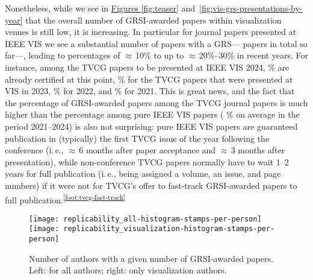 \documentclass[conference,svgnames]{vgtc}                     %
\newcommand*{\percentageRounded}[2]{%
	\pgfmathparse{#1*100/#2}%
	\pgfmathprintnumber[fixed, precision=1]{\pgfmathresult}%
}
\newcommand{\ie}{i.\,e.}
\begin{document}
Nonetheless, while we see in \hyperref[fig:teaser]{Figures \ref{fig:teaser}} and~\ref{fig:vis-grs-presentations-by-year} that the overall number of GRSI-awarded papers within visualization venues is still low, it is increasing. In particular for journal papers presented at IEEE VIS we see a substantial number of papers with a GRS---\GrsiIeeeVisJournalPresentationsCount{} papers in total so far---, leading to percentages of $\approx$\,10\% to up to $\approx$\,20\%--30\% in recent years.
For instance, among the TVCG papers to be presented at IEEE VIS 2024, \percentageRounded{\GrsiIeeeVisTVCGJournalPapersInMMXXIV}{\TotalIeeeVisTVCGJournalPapersInMMXXIV}\% are already certified at this point, \percentageRounded{\GrsiIeeeVisTVCGJournalPapersInMMXXIII}{\TotalIeeeVisTVCGJournalPapersInMMXXIII}\% for the TVCG papers that were presented at VIS in 2023, \percentageRounded{\GrsiIeeeVisTVCGJournalPapersInMMXXII}{\TotalIeeeVisTVCGJournalPapersInMMXXII}\% for 2022, and \percentageRounded{\GrsiIeeeVisTVCGJournalPapersInMMXXI}{\TotalIeeeVisTVCGJournalPapersInMMXXI}\% for 2021. 
This is great news, and the fact that the percentage of GRSI-awarded papers among the TVCG journal papers is much higher than the percentage among pure IEEE VIS papers (\percentageRounded{(\GrsiIeeeVisPapersInMMXXIV+\GrsiIeeeVisPapersInMMXXIII+\GrsiIeeeVisPapersInMMXXII+\GrsiIeeeVisPapersInMMXXI)}{(\TotalIeeeVisPapersInMMXXIV+\TotalIeeeVisPapersInMMXXIII+\TotalIeeeVisPapersInMMXXII+\TotalIeeeVisPapersInMMXXI)}\% on average in the period 2021--2024) is also not surprising: pure IEEE VIS papers are guaranteed publication in (typically) the first TVCG issue of the year following the conference (\ie, $\approx$\,6 months after paper acceptance and $\approx$\,3 months after presentation), while non-con\-fe\-rence TVCG papers normally have to wait 1--2 years for full publication (\ie, being assigned a volume, an issue, and page numbers) if it were not for TVCG's offer to fast-track GRSI-awarded papers to full publication.\textsuperscript{\ref{foot:tvcg-fast-track}}

\begin{figure}
	\centering
	\texttt{[image: replicability\_all-histogram-stamps-per-person]}\hfill%
	\texttt{[image: replicability\_visualization-histogram-stamps-per-person]}%
	\caption{Number of authors with a given number of GRSI-awarded papers. Left: for all authors; right: only visualization authors.}
	\label{fig:vis-grs-per-author}
\end{figure}
\end{document}
